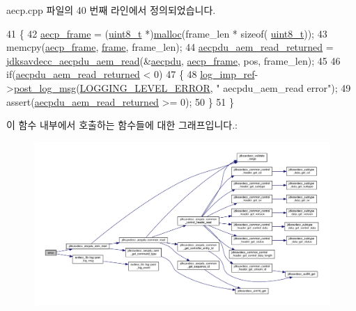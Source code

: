 aecp.\+cpp 파일의 40 번째 라인에서 정의되었습니다.


\begin{DoxyCode}
41     \{
42         \hyperlink{classavdecc__lib_1_1aecp_a41fc9e01707fd001e8eb58d6c2128f8c}{aecp\_frame} = (\hyperlink{stdint_8h_aba7bc1797add20fe3efdf37ced1182c5}{uint8\_t} *)\hyperlink{_memory_leak_detector_malloc_macros_8h_ab8b25cd8f16d4a6552afe4e65c4f082d}{malloc}(frame\_len * \textcolor{keyword}{sizeof}(
      \hyperlink{stdint_8h_aba7bc1797add20fe3efdf37ced1182c5}{uint8\_t}));
43         memcpy(\hyperlink{classavdecc__lib_1_1aecp_a41fc9e01707fd001e8eb58d6c2128f8c}{aecp\_frame}, \hyperlink{gst__avb__playbin_8c_ac8e710e0b5e994c0545d75d69868c6f0}{frame}, frame\_len);
44         \hyperlink{classavdecc__lib_1_1aecp_a30b853a4ad117cebc9ad63b505ec0c51}{aecpdu\_aem\_read\_returned} = 
      \hyperlink{group__aecpdu__aem_gae2421015dcdce745b4f03832e12b4fb6}{jdksavdecc\_aecpdu\_aem\_read}(&\hyperlink{classavdecc__lib_1_1aecp_a46b8ce55af795e99de50638b2540d78d}{aecpdu}, \hyperlink{classavdecc__lib_1_1aecp_a41fc9e01707fd001e8eb58d6c2128f8c}{aecp\_frame}, pos, frame\_len);
45 
46         \textcolor{keywordflow}{if}(\hyperlink{classavdecc__lib_1_1aecp_a30b853a4ad117cebc9ad63b505ec0c51}{aecpdu\_aem\_read\_returned} < 0)
47         \{
48             \hyperlink{namespaceavdecc__lib_acbe3e2a96ae6524943ca532c87a28529}{log\_imp\_ref}->\hyperlink{classavdecc__lib_1_1log_a68139a6297697e4ccebf36ccfd02e44a}{post\_log\_msg}(\hyperlink{namespaceavdecc__lib_a501055c431e6872ef46f252ad13f85cdaf2c4481208273451a6f5c7bb9770ec8a}{LOGGING\_LEVEL\_ERROR}, \textcolor{stringliteral}{"
      aecpdu\_aem\_read error"});
49             assert(\hyperlink{classavdecc__lib_1_1aecp_a30b853a4ad117cebc9ad63b505ec0c51}{aecpdu\_aem\_read\_returned} >= 0);
50         \}
51     \}
\end{DoxyCode}


이 함수 내부에서 호출하는 함수들에 대한 그래프입니다.\+:
\nopagebreak
\begin{figure}[H]
\begin{center}
\leavevmode
\includegraphics[width=350pt]{classavdecc__lib_1_1aecp_ae1ac853c21a808d40791d17d86d8735a_cgraph}
\end{center}
\end{figure}


